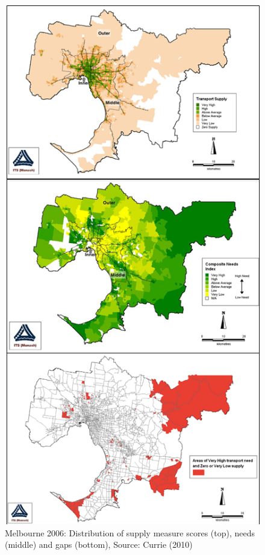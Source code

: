 \documentclass[preprint, 3p,
authoryear]{elsarticle} %
\begin{document}
\begin{figure}
\includegraphics[width=1\linewidth]{graphics/Currie2010combined1} \caption{Melbourne 2006: Distribution of supply measure scores (top), needs (middle) and gaps (bottom), Source: Currie (2010)}\label{fig:Currie_map_SI}
\end{figure}
\end{document}
